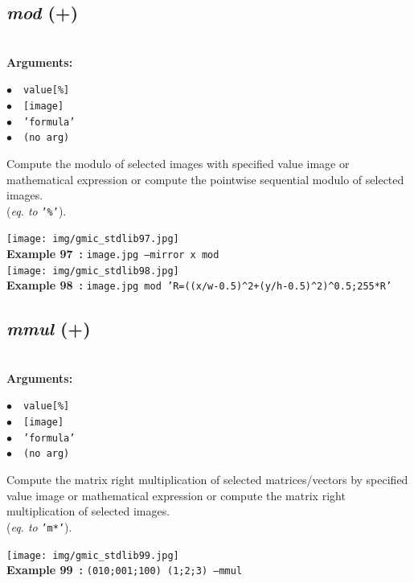 \documentclass[a4paper,10.5pt,twoside]{book}
\def\comma{\discretionary{,}{}{,}}
\newcommand{\Cb}[1]{\textcolor{cb}{#1}}
\begin{document}
\subsection{\emph{mod} (+)}\vspace*{-0.7em}
~\\\textbf{\Cb{Arguments: }}\begin{flushleft}
{\small \Cb{\hspace*{0.5cm}$\bullet$~~\texttt{value[\%]}}}~~~\\
{\small \Cb{\hspace*{0.5cm}$\bullet$~~\texttt{[image]}}}~~~\\
{\small \Cb{\hspace*{0.5cm}$\bullet$~~\texttt{'formula'}}}~~~\\
{\small \Cb{\hspace*{0.5cm}$\bullet$~~\texttt{(no arg)}}}\end{flushleft}
Compute the modulo of selected images with specified value{\comma} image or mathematical
expression{\comma} or compute the pointwise sequential modulo of selected images.
~\\(\emph{eq. to} {\small \texttt{'\%'}}).
\begin{center}\texttt{[image: img/gmic\_stdlib97.jpg]}\\
{\footnotesize \textbf{Example 97~:} \texttt{image.jpg --mirror x mod}}
\\\texttt{[image: img/gmic\_stdlib98.jpg]}\\
{\footnotesize \textbf{Example 98~:} \texttt{image.jpg mod 'R=((x/w-0.5)\textasciicircum 2+(y/h-0.5)\textasciicircum 2)\textasciicircum 0.5;255*R'}}
\end{center}

\subsection{\emph{mmul} (+)}\vspace*{-0.7em}
~\\\textbf{\Cb{Arguments: }}\begin{flushleft}
{\small \Cb{\hspace*{0.5cm}$\bullet$~~\texttt{value[\%]}}}~~~\\
{\small \Cb{\hspace*{0.5cm}$\bullet$~~\texttt{[image]}}}~~~\\
{\small \Cb{\hspace*{0.5cm}$\bullet$~~\texttt{'formula'}}}~~~\\
{\small \Cb{\hspace*{0.5cm}$\bullet$~~\texttt{(no arg)}}}\end{flushleft}
Compute the matrix right multiplication of selected matrices/vectors by specified value{\comma} image or
mathematical expression{\comma} or compute the matrix right multiplication of selected images.
~\\(\emph{eq. to} {\small \texttt{'m*'}}).
\begin{center}\texttt{[image: img/gmic\_stdlib99.jpg]}\\
{\footnotesize \textbf{Example 99~:} \texttt{(0{\comma}1{\comma}0;0{\comma}0{\comma}1;1{\comma}0{\comma}0) (1;2;3) --mmul}}
\end{center}
\end{document}
